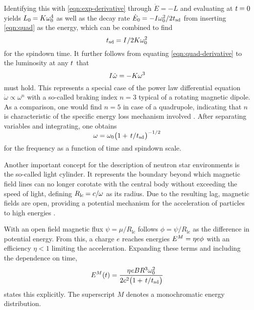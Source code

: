 \newpage

Identifying this with \eqref{eqn:exp-derivative} through $\dot{E} = -L$ and evaluating at $t \kern-0.3pt= 0$ yields
$L_0 \kern-0.3pt = \kern-0.2pt K \omega_0^4$ as well as the decay rate $\dot{E}_0 \kern-0.3pt = -I \omega_0^2 / 2 \kern+0.4pt t_\text{sd}$
from inserting \eqref{eqn:quad} as the energy, which can be combined to find
\begin{equation}
	t_\text{sd} = I \kern+0.5pt / 2K\omega_0^2
	\label{eqn:spindown-time}
\end{equation}
for the spindown time. It further follows from equating \eqref{eqn:quad-derivative} to the luminosity at any $t \kern+0.5pt$ that
\begin{equation}
	I \kern+0.5pt \dot{\omega} = -K \omega^3
\end{equation}
must hold. This represents a special case of the power law differential equation $\dot{\omega} \propto \omega^n$ with a so-called
braking index $n = 3$ typical of a rotating magnetic dipole. As a comparison, one would find $n = 5$ in case of a quadrupole, indicating
that $n$ is characteristic of the specific energy loss mechanism involved \cite{Alvarez_2004}. After separating variables and integrating,
one obtains
\begin{equation}
	\omega = \omega_0 \smash{\bigl( 1 + \kern+1.5pt t \kern+0.1pt / \kern+0.2pt t_\text{sd} \kern+0.5pt \bigr)^{-1/2}}
	\label{eqn:frequency}
\end{equation}
for the frequency as a function of time and spindown scale.

Another important concept for the description of neutron star environments is the so-called light cylinder. It represents the boundary
beyond which magnetic field lines can no longer corotate with the central body without exceeding the speed of light, defining
$R_\text{lc} \kern-0.6pt = c / \kern-0.4pt \omega$ as its radius. Due to the resulting lag, magnetic fields
are open, providing a potential mechanism for the acceleration of particles to high energies \cite{Goldreich_1969}.

With an open field magnetic flux $\psi = \mu / R_\text{lc}$ follows $\phi = \psi / R_\text{lc}$ as the difference in potential energy.
From this, a charge $e$ reaches energies $E^M = \eta e \phi \kern+0.5pt$ with an efficiency $\eta < 1$ limiting the acceleration.
Expanding these terms and including the dependence on time,
\begin{equation}
	E^M(t) = \frac{\eta \kern+0.5pt e B R^3 \omega_0^2}{2c^2 \bigl( 1 + \kern+1.5pt t \kern+0.1pt / \kern+0.2pt t_\text{sd} \kern+0.5pt \bigr)}
	\label{eqn:mono}
\end{equation}
states this explicitly. The superscript $M$ denotes a monochromatic energy distribution.



